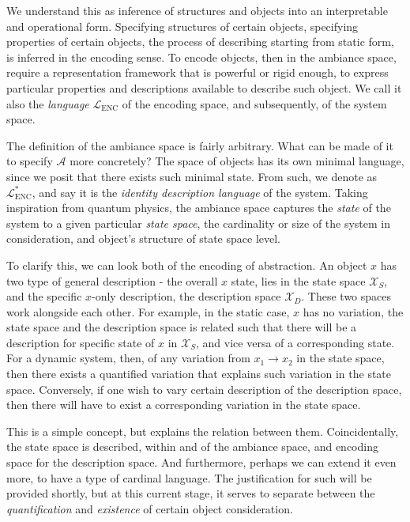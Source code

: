 We understand this as inference of structures and objects into an interpretable and operational form. Specifying structures of certain objects, specifying properties of certain objects, the process of describing starting from static form, is inferred in the encoding sense. To encode objects, then in the ambiance space, require a representation framework that is powerful or rigid enough, to express particular properties and descriptions available to describe such object. We call it also the \textit{language} $\mathcal{L}_{\mathrm{ENC}}$ of the encoding space, and subsequently, of the system space. 

The definition of the ambiance space is fairly arbitrary. What can be made of it to specify $\mathcal{A}$ more concretely? The space of objects has its own minimal language, since we posit that there exists such minimal state. From such, we denote as $\mathcal{L}_{\mathrm{ENC}}^{*}$, and say it is the \textit{identity description language} of the system. Taking inspiration from quantum physics, the ambiance space captures the \textit{state} of the system to a given particular \textit{state space}, the cardinality or size of the system in consideration, and object's structure of state space level. 

To clarify this, we can look both of the encoding of abstraction. An object $x$ has two type of general description - the overall $x$ state, lies in the state space $\mathcal{X}_{S}$, and the specific $x$-only description, the description space $\mathcal{X}_{D}$. These two spaces work alongside each other. For example, in the static case, $x$ has no variation, the state space and the description space is related such that there will be a description for specific state of $x$ in $\mathcal{X}_{S}$, and vice versa of a corresponding state. For a dynamic system, then, of any variation from $x_{1}\to x_{2}$ in the state space, then there exists a quantified variation that explains such variation in the state space. Conversely, if one wish to vary certain description of the description space, then there will have to exist a corresponding variation in the state space. 

This is a simple concept, but explains the relation between them. Coincidentally, the state space is described, within and of the ambiance space, and encoding space for the description space. And furthermore, perhaps we can extend it even more, to have a type of cardinal language. The justification for such will be provided shortly, but at this current stage, it serves to separate between the \textit{quantification} and \textit{existence} of certain object consideration. 


